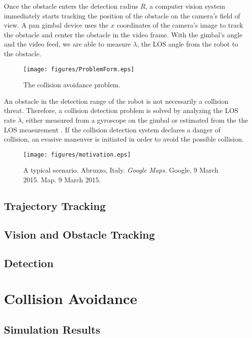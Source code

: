 \documentclass[]{aiaa-tc}%
\begin{document}
Once the obstacle enters the detection radius $R$, a computer vision system immediately starts tracking the position of the obstacle on the camera's field of view. A pan gimbal device uses the $x$ coordinates of the camera's image to track the obstacle and center the obstacle in the video frame. With the gimbal's angle and the video feed, we are able to measure $\lambda$, the LOS angle from the robot to the obstacle. 

\begin{figure}[h]
	\centering
	\texttt{[image: figures/ProblemForm.eps]}
	\caption{The collision avoidance problem.}
	\label{fig:ProbForm}
\end{figure}

An obstacle in the detection range of the robot is not necessarily a collision threat. Therefore, a collision detection problem is solved by analyzing the LOS rate $\dot{\lambda}$, either measured from a gyroscope on the gimbal or estimated from the the LOS measurement \cite{1014675}. If the collision detection system declares a danger of collision, an evasive maneuver is initiated in order to avoid the possible collision.


\begin{figure}[h]
	\centering
	\texttt{[image: figures/motivation.eps]}
	\caption{A typical scenario. Abruzzo, Italy. \emph{Google Maps}. Google, 9 March 2015. Map. 9 March 2015.}
	\label{fig:motivation}
\end{figure}

\subsection{Trajectory Tracking}



\subsection{Vision and Obstacle Tracking}

\subsection{Detection}

\section{Collision Avoidance}

\subsection{Simulation Results}
\end{document}
